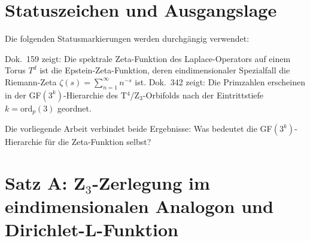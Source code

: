 \begin{abstract}
Zwei weitere Ergebnisse:
\textbf{(E)}~Die harmonischen Primen $\{5,7,11,13\}$ sind durch die
Primfaktorzerlegungen von $3^k-1$ für $k=3,4,5,6$ eindeutig erzwungen;
$p=13$ ist die weltweit einzige Primzahl mit $\mathrm{ord}_p(3)=3$ \BM\,\LM.
\textbf{(F)}~Die Euler-Faktor-Schwelle bei $p^*\approx9{,}76$ ($s=2$) markiert
das 7-limit exakt; ab $p_\mathrm{max}\approx30$ liegt die Galois-Produktdichte
auf Zufallsniveau; die Weyl-Obstruktion (Dok.~316) zeigt, dass die Grenze
nicht im Werkzeug liegt; Shors Schaltkreismodell ist digital und davon nicht betroffen, der physische
Apparat aber ein Resonanzsystem, das den Resonanzgrenzen unterliegt, solange das
Schwellentheorem bei Skalierung nicht demonstriert ist \SM; empirisch ist kein
Quantenvorteil nachgewiesen.

Prüfskripte: \texttt{pruef\_343\_zeta\_galois.py},
\texttt{pruef\_343b\_klassen\_symmetrie.py},
\texttt{pruef\_343g\_epstein\_satzA.py},
\texttt{pruef\_343h\_gf3k\_vierdimensional.py},
\texttt{pruef\_344\_primzahlmuster.py}.
\end{abstract}

\section{Statuszeichen und Ausgangslage}

Die folgenden Statusmarkierungen werden durchgängig verwendet:


Dok.~159 zeigt: Die spektrale Zeta-Funktion des Laplace-Operators auf einem
Torus $T^d$ ist die Epstein-Zeta-Funktion, deren eindimensionaler Spezialfall die
Riemann-Zeta $\zeta(s) = \sum_{n=1}^\infty n^{-s}$ ist.
Dok.~342 zeigt: Die Primzahlen erscheinen in der GF$(3^k)$-Hierarchie des
T$^4$/Z$_3$-Orbifolds nach der Eintrittstiefe $k = \mathrm{ord}_p(3)$ geordnet.

Die vorliegende Arbeit verbindet beide Ergebnisse: Was bedeutet die
GF$(3^k)$-Hierarchie für die Zeta-Funktion selbst?

\section{Satz A: Z$_3$-Zerlegung im eindimensionalen Analogon und Dirichlet-L-Funktion}

